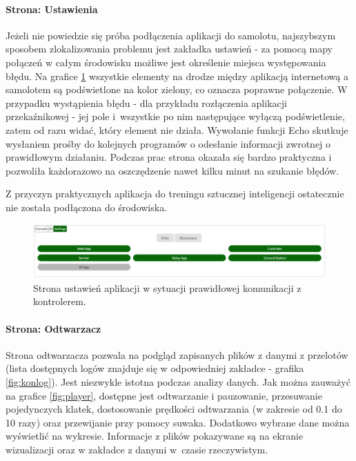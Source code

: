 \documentclass[12pt, a4paper]{article}
\begin{document}
\paragraph{Strona: Ustawienia}\mbox{}

Jeżeli nie powiedzie się próba podłączenia aplikacji do samolotu, najszybszym sposobem zlokalizowania problemu jest zakładka ustawień - za pomocą mapy połączeń w całym środowisku możliwe jest określenie miejsca występowania błędu. Na grafice \ref{fig:settings} wszystkie elementy na drodze między aplikacją internetową a samolotem są podświetlone na kolor zielony, co oznacza poprawne połączenie. W przypadku wystąpienia błędu - dla przykładu rozłączenia aplikacji przekaźnikowej - jej pole i~wszystkie po nim następujące wyłączą podświetlenie, zatem od razu widać, który element nie działa. Wywołanie funkcji Echo skutkuje wysłaniem prośby do kolejnych programów o odesłanie informacji zwrotnej o prawidłowym działaniu. Podczas prac strona okazała się bardzo praktyczna i pozwoliła każdorazowo na oszczędzenie nawet kilku minut na szukanie błędów. 

Z przyczyn praktycznych aplikacja do treningu sztucznej inteligencji ostatecznie nie została podłączona do środowiska.

 \begin{figure}[H]
    \centering
    \includegraphics[width=1\textwidth]{settings}
    \caption{Strona ustawień aplikacji w sytuacji prawidłowej komunikacji z kontrolerem.}
    \label{fig:settings}
\end{figure}
\clearpage
\paragraph{Strona: Odtwarzacz}\mbox{}

Strona odtwarzacza pozwala na podgląd zapisanych plików z danymi z przelotów (lista dostępnych logów znajduje się w odpowiedniej zakładce - grafika \ref{fig:konlog}). Jest niezwykle istotna podczas analizy danych. Jak można zauważyć na grafice \ref{fig:player}, dostępne jest odtwarzanie i pauzowanie, przesuwanie pojedynczych klatek, dostosowanie prędkości odtwarzania (w zakresie od 0.1 do 10 razy) oraz przewijanie przy pomocy suwaka. Dodatkowo wybrane dane można wyświetlić na wykresie. Informacje z plików pokazywane są na ekranie wizualizacji oraz w zakładce z danymi w~czasie rzeczywistym.
\end{document}
